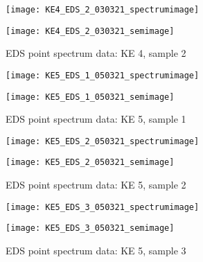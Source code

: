 \begin{figure}[H]
\centering
\begin{minipage}{.45\textwidth}
  \centering
  \texttt{[image: KE4\_EDS\_2\_030321\_spectrumimage]}
\end{minipage}
\begin{minipage}{.45\textwidth}
  \centering
  \texttt{[image: KE4\_EDS\_2\_030321\_semimage]}
\end{minipage}
\caption[EDS point spectrum data: KE 4, sample 2]{EDS point spectrum data: KE 4, sample 2}
\label{fig:ke4_point_eds_2}
\end{figure}




\begin{figure}[H]
\centering
\begin{minipage}{.45\textwidth}
  \centering
  \texttt{[image: KE5\_EDS\_1\_050321\_spectrumimage]}
\end{minipage}
\begin{minipage}{.45\textwidth}
  \centering
  \texttt{[image: KE5\_EDS\_1\_050321\_semimage]}
\end{minipage}
\caption[EDS point spectrum data: KE 5, sample 1]{EDS point spectrum data: KE 5, sample 1}
\label{fig:ke5_point_eds_1}
\end{figure}

\begin{figure}[H]
\centering
\begin{minipage}{.45\textwidth}
  \centering
  \texttt{[image: KE5\_EDS\_2\_050321\_spectrumimage]}
\end{minipage}
\begin{minipage}{.45\textwidth}
  \centering
  \texttt{[image: KE5\_EDS\_2\_050321\_semimage]}
\end{minipage}
\caption[EDS point spectrum data: KE 5, sample 2]{EDS point spectrum data: KE 5, sample 2}
\label{fig:ke5_point_eds_2}
\end{figure}

\begin{figure}[H]
\centering
\begin{minipage}{.45\textwidth}
  \centering
  \texttt{[image: KE5\_EDS\_3\_050321\_spectrumimage]}
\end{minipage}
\begin{minipage}{.45\textwidth}
  \centering
  \texttt{[image: KE5\_EDS\_3\_050321\_semimage]}
\end{minipage}
\caption[EDS point spectrum data: KE 5, sample 3]{EDS point spectrum data: KE 5, sample 3}
\label{fig:ke5_point_eds_3}
\end{figure}


